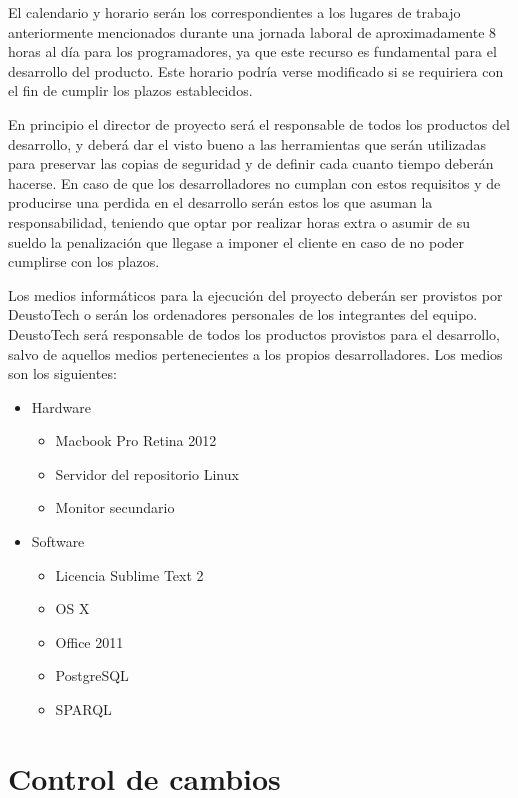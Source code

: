 El calendario y horario serán los correspondientes a los lugares de trabajo anteriormente mencionados durante una jornada laboral de aproximadamente 8 horas al día para los programadores, ya que este recurso es fundamental para el desarrollo del producto. Este horario podría verse modificado si se requiriera con el fin de cumplir los plazos establecidos.

En principio el director de proyecto será el responsable de todos los productos del desarrollo, y deberá dar el visto bueno a las herramientas que serán utilizadas para preservar las copias de seguridad y de definir cada cuanto tiempo deberán hacerse. En caso de que los desarrolladores no cumplan con estos requisitos y de producirse una perdida en el desarrollo serán estos los que asuman la responsabilidad, teniendo que optar por realizar horas extra o asumir de su sueldo la penalización que llegase a imponer el cliente en caso de no poder cumplirse con los plazos.

Los medios informáticos para la ejecución del proyecto deberán ser provistos por DeustoTech o serán los ordenadores personales de los integrantes del equipo. DeustoTech será responsable de todos los productos provistos para el desarrollo, salvo de aquellos medios pertenecientes a los propios desarrolladores. Los medios son los siguientes: 

\begin{itemize}
	\item Hardware
	\begin{itemize}
		\item Macbook Pro Retina 2012
		\item Servidor del repositorio Linux
		\item Monitor secundario
	\end{itemize}
	\item Software
	\begin{itemize}
		\item Licencia Sublime Text 2
		\item OS X
		\item Office 2011
		\item PostgreSQL
		\item SPARQL
	\end{itemize}
\end{itemize}

\section{Control de cambios}

